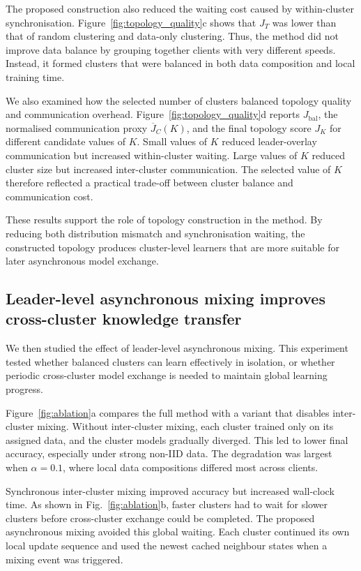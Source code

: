 \documentclass[pdflatex,sn-mathphys-num]{sn-jnl}
\begin{document}
The proposed construction also reduced the waiting cost caused by within-cluster synchronisation. Figure~\ref{fig:topology_quality}c shows that \(J_T\) was lower than that of random clustering and data-only clustering. Thus, the method did not improve data balance by grouping together clients with very different speeds. Instead, it formed clusters that were balanced in both data composition and local training time.

We also examined how the selected number of clusters balanced topology quality and communication overhead. Figure~\ref{fig:topology_quality}d reports \(J_{\mathrm{bal}}\), the normalised communication proxy \(\overline{J}_C(K)\), and the final topology score \(J_K\) for different candidate values of \(K\). Small values of \(K\) reduced leader-overlay communication but increased within-cluster waiting. Large values of \(K\) reduced cluster size but increased inter-cluster communication. The selected value of \(K\) therefore reflected a practical trade-off between cluster balance and communication cost.

These results support the role of topology construction in the method. By reducing both distribution mismatch and synchronisation waiting, the constructed topology produces cluster-level learners that are more suitable for later asynchronous model exchange.

\subsection{Leader-level asynchronous mixing improves cross-cluster knowledge transfer}
\label{subsec:asynchronous_mixing_results}

We then studied the effect of leader-level asynchronous mixing. This experiment tested whether balanced clusters can learn effectively in isolation, or whether periodic cross-cluster model exchange is needed to maintain global learning progress.

Figure~\ref{fig:ablation}a compares the full method with a variant that disables inter-cluster mixing. Without inter-cluster mixing, each cluster trained only on its assigned data, and the cluster models gradually diverged. This led to lower final accuracy, especially under strong non-IID data. The degradation was largest when \(\alpha=0.1\), where local data compositions differed most across clients.

Synchronous inter-cluster mixing improved accuracy but increased wall-clock time. As shown in Fig.~\ref{fig:ablation}b, faster clusters had to wait for slower clusters before cross-cluster exchange could be completed. The proposed asynchronous mixing avoided this global waiting. Each cluster continued its own local update sequence and used the newest cached neighbour states when a mixing event was triggered.
\end{document}
